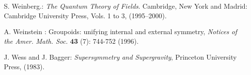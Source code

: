 \documentclass[12pt]{article}
\theoremstyle{plain}
\theoremstyle{definition}
\numberwithin{equation}{section}
\newcommand{\<}{{\langle}}
\begin{document}
\begin{thebibliography}{9}
S. Weinberg.: \emph{The Quantum Theory of Fields}. Cambridge, New York and Madrid: 
Cambridge University Press, Vols. 1 to 3, (1995--2000).

A. Weinstein : Groupoids: unifying internal and external symmetry,
\emph{Notices of the Amer. Math. Soc.} \textbf{43} (7): 744-752 (1996).

J. Wess and J. Bagger: \emph{Supersymmetry and Supergravity},
Princeton University Press, (1983).
\end{thebibliography}
\end{document}

